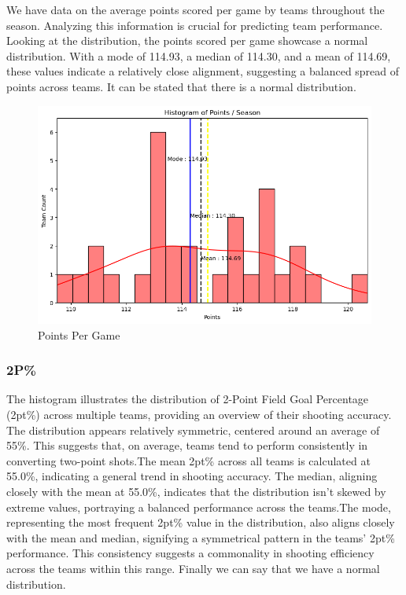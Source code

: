 \documentclass[conference]{IEEEtran}
\begin{document}
We have data on the average points scored per game by teams throughout the season. Analyzing this information is crucial for predicting team performance. Looking at the distribution, the points scored per game showcase a normal distribution. With a mode of 114.93, a median of 114.30, and a mean of 114.69, these values indicate a relatively close alignment, suggesting a balanced spread of points across teams. It can be stated that there is a normal distribution.
\begin{figure}[h]
    \centering
    \includegraphics[scale=0.41]{PTS_image.png}
    \caption{Points Per Game}
    \label{fig:enter-label}
\end{figure}

\vspace{\baselineskip}
\vspace{\baselineskip}
\vspace{\baselineskip}
\subsubsection{2P\%}
The histogram illustrates the distribution of 2-Point Field Goal Percentage (2pt\%) across multiple teams, providing an overview of their shooting accuracy. The distribution appears relatively symmetric, centered around an average of 55\%. This suggests that, on average, teams tend to perform consistently in converting two-point shots.The mean 2pt\% across all teams is calculated at 55.0\%, indicating a general trend in shooting accuracy. The median, aligning closely with the mean at 55.0\%, indicates that the distribution isn't skewed by extreme values, portraying a balanced performance across the teams.The mode, representing the most frequent 2pt\% value in the distribution, also aligns closely with the mean and median, signifying a symmetrical pattern in the teams' 2pt\% performance. This consistency suggests a commonality in shooting efficiency across the teams within this range. Finally we can say that we have a normal distribution.
\end{document}
